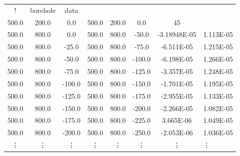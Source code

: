 \begin{fileExample}
\begin{tabular}{|cccccccl|}
\hline
! & borehole & data &  &  &  &  & \\
500.0 & 200.0 &	0.0 & 500.0 & 200.0 &	0.0 &	45 & \\
500.0 & 800.0 &	0.0 & 500.0 & 800.0 &	-50.0 & -3.18948E-05 & 1.113E-05\\
500.0 & 800.0 &	-25.0 & 500.0 & 800.0 &	-75.0 & -6.511E-05 & 1.215E-05\\
500.0 & 800.0 &	-50.0 & 500.0 & 800.0 & -100.0 & -6.198E-05 & 1.266E-05\\
500.0 & 800.0 &	-75.0 & 500.0 & 800.0 & -125.0 & -3.357E-05 & 1.248E-05\\
500.0 & 800.0 & -100.0 & 500.0 & 800.0 & -150.0 & -1.701E-05 & 1.195E-05\\
500.0 & 800.0 & -125.0 & 500.0 & 800.0 & -175.0 & -2.955E-05 & 1.133E-05\\
500.0 & 800.0 & -150.0 & 500.0 & 800.0 & -200.0 & -2.266E-05 & 1.082E-05\\
500.0 & 800.0 & -175.0 & 500.0 & 800.0 & -225.0 &	3.665E-06 & 1.049E-05\\
500.0 & 800.0 & -200.0 & 500.0 & 800.0 & -250.0 & -2.053E-06 & 1.036E-05\\
\vdots & \vdots & \vdots & \vdots & \vdots & \vdots & \vdots & \vdots \\
\hline
\end{tabular}
\end{fileExample}